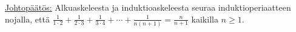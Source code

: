 \documentclass[a4paper,12pt]{article}
\begin{document}
\begin{enumerate}
\underline{Johtopäätös:} Alkuaskeleesta ja induktioaskeleesta seuraa induktioperiaatteen nojalla, että $\frac{1}{1\cdot 2}+\frac{1}{2\cdot 3}+\frac{1}{3\cdot 4}+\cdots+\frac{1}{n(n+1)}=\frac{n}{n+1}$ kaikilla $n \geq 1$.

\end{enumerate}
\end{document}
